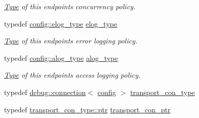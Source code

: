 \begin{DoxyCompactItemize}
\begin{DoxyCompactList}\small\item\em \mbox{\hyperlink{struct_type}{Type}} of this endpoint\textquotesingle{}s concurrency policy. \end{DoxyCompactList}\item 
\mbox{\label{classwebsocketpp_1_1transport_1_1debug_1_1endpoint_a3616bf82ba2a1026fad9de8145bd9375}} 
typedef \mbox{\hyperlink{classwebsocketpp_1_1log_1_1stub}{config\+::elog\+\_\+type}} \mbox{\hyperlink{classwebsocketpp_1_1transport_1_1debug_1_1endpoint_a3616bf82ba2a1026fad9de8145bd9375}{elog\+\_\+type}}
\begin{DoxyCompactList}\small\item\em \mbox{\hyperlink{struct_type}{Type}} of this endpoint\textquotesingle{}s error logging policy. \end{DoxyCompactList}\item 
\mbox{\label{classwebsocketpp_1_1transport_1_1debug_1_1endpoint_ab2b8a06c2ba2a9ae26def00aefcbc930}} 
typedef \mbox{\hyperlink{classwebsocketpp_1_1log_1_1stub}{config\+::alog\+\_\+type}} \mbox{\hyperlink{classwebsocketpp_1_1transport_1_1debug_1_1endpoint_ab2b8a06c2ba2a9ae26def00aefcbc930}{alog\+\_\+type}}
\begin{DoxyCompactList}\small\item\em \mbox{\hyperlink{struct_type}{Type}} of this endpoint\textquotesingle{}s access logging policy. \end{DoxyCompactList}\item 
typedef \mbox{\hyperlink{classwebsocketpp_1_1transport_1_1debug_1_1connection}{debug\+::connection}}$<$ \mbox{\hyperlink{classconfig}{config}} $>$ \mbox{\hyperlink{classwebsocketpp_1_1transport_1_1debug_1_1endpoint_a267bc670b0cecf80aa39ee266785e9ba}{transport\+\_\+con\+\_\+type}}
\item 
typedef \mbox{\hyperlink{classwebsocketpp_1_1transport_1_1debug_1_1connection_a40631f93557c3308c2c8c7897e6a4825}{transport\+\_\+con\+\_\+type\+::ptr}} \mbox{\hyperlink{classwebsocketpp_1_1transport_1_1debug_1_1endpoint_ab261a090fca072aea9b5dba04aba4c6d}{transport\+\_\+con\+\_\+ptr}}
\end{DoxyCompactItemize}
